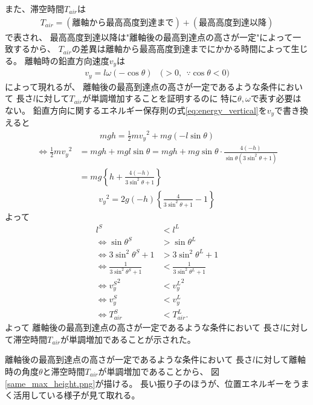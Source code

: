 \documentclass[a4paper,11pt]{jsarticle}
\begin{document}
また、滞空時間$T_{air}$は
\begin{align}
  T_{air} = (\textrm{離軸から最高高度到達まで}) + (\textrm{最高高度到達以降})
\end{align}
で表され、
最高高度到達以降は"離軸後の最高到達点の高さが一定"によって一致するから、
$T_{air}$の差異は離軸から最高高度到達までにかかる時間によって生じる。
離軸時の鉛直方向速度$v_y$は
\begin{align}
  v_y = l\omega (-\cos\theta) \ \ \ \ \Big( > 0, \ \ \because \cos\theta < 0 \Big)
\end{align}
によって現れるが、
離軸後の最高到達点の高さが一定であるような条件において
長さ$l$に対して$T_{air}$が単調増加することを証明するのに
特に$\theta, \omega$で表す必要はない。
鉛直方向に関するエネルギー保存則の式\ref{eq:energy_vertical}を$v_y$で書き換えると
\begin{align}
  mgh = \frac{1}{2}m{v_y}^2 + mg (-l \sin\theta)
\end{align}
\begin{align}
  \Leftrightarrow
  \frac{1}{2}m{v_y}^2
  &= mgh + mgl\sin\theta
  = mgh + mg\sin\theta\cdot\frac{4(-h)}{\sin\theta(3\sin^2\theta + 1)}
  \\
  &= mg\left\{ h + \frac{4(-h)}{3\sin^2\theta + 1} \right\}
\end{align}
\begin{align}
  {v_y}^2 = 2g(-h)\left\{ \frac{4}{3\sin^2\theta + 1} - 1 \right\}
\end{align}
よって
\begin{align}
  l^S &< l^L
  \\
  \Leftrightarrow
  \sin\theta^S &> \sin\theta^L
  \\
  \Leftrightarrow
  3\sin^2\theta^S + 1 &> 3\sin^2\theta^L + 1
  \\
  \Leftrightarrow
  \frac{1}{3\sin^2\theta^S + 1} &< \frac{1}{3\sin^2\theta^L + 1}
  \\
  \Leftrightarrow
  {v_y^S}^2 &< {v_y^L}^2
  \\
  \Leftrightarrow
  v_y^S &< v_y^L
  \\
  \Leftrightarrow
  T_{air}^S &< T_{air}^L.
\end{align}
よって
離軸後の最高到達点の高さが一定であるような条件において
長さ$l$に対して滞空時間$T_{air}$が単調増加であることが示された。

離軸後の最高到達点の高さが一定であるような条件において
長さ$l$に対して離軸時の角度$\theta$と滞空時間$T_{air}$が単調増加であることから、
図\ref{same_max_height.png}が描ける。
長い振り子のほうが、位置エネルギーをうまく活用している様子が見て取れる。
\end{document}
